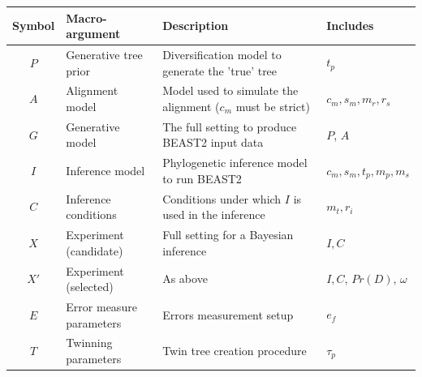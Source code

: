 \documentclass{article}
\begin{document}
\begin{table}
  \begin{tabular}{|@{}c|p{4cm}|p{9cm}|p{3cm}@{}|}
    \hline
    \centering
    \textbf{Symbol} & \textbf{Macro-argument} & \textbf{Description} 
      & \textbf{Includes} \\
    \hline
    $\mathit{P}$ & Generative tree prior & Diversification model to generate 
      the 'true' tree & $\mathit{t_{p}}$ \\
    $\mathit{A}$ & Alignment model & Model used to simulate the 
      alignment ($\mathit{c_{m}}$ must be strict) 
      & $\mathit{c_{m}}, \mathit{s_{m}}, \mathit{m_{r}}, \mathit{r_{s}}$ \\
    $\mathit{G}$ & Generative model & The full setting to produce BEAST2 input 
      data & $\mathit{P}$, $\mathit{A}$ \\
    $\mathit{I}$ & Inference model & Phylogenetic inference model to run BEAST2 
      & $\mathit{c_{m}}, \mathit{s_{m}}, \mathit{t_{p}}, 
      \mathit{m_{p}}, \mathit{m_{s}}$ \\
    $\mathit{C}$ & Inference conditions & Conditions under which $\mathit{I}$ 
      is used in the inference & $\mathit{m_{t}}, \mathit{r_{i}}$\\
    $\mathit{X}$ & Experiment (candidate) 
      & Full setting for a Bayesian inference 
      & $\mathit{I},\mathit{C}$ \\
    $\mathit{X'}$ & Experiment (selected) & As above & 
      $\mathit{I},\mathit{C}$, $Pr(D)$, $\omega$ \\
    $\mathit{E}$ & Error measure parameters & Errors measurement setup & 
      $\mathit{e_{f}}$\\
    $\mathit{T}$ & Twinning parameters & Twin tree creation procedure & 
      $\mathit{\tau_{p}}$\\

\end{tabular}
\end{table}
\end{document}
